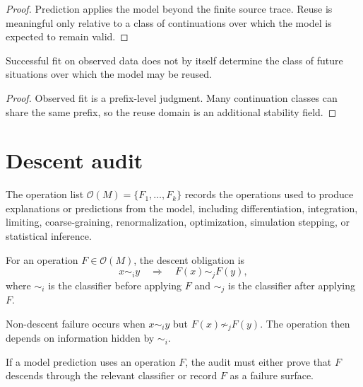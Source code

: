 \begin{proof}
Prediction applies the model beyond the finite source trace. Reuse is meaningful only relative to a class of continuations over which the model is expected to remain valid.
\end{proof}

\begin{corollary}
\label{cor:observed-success-not-own-domain}
Successful fit on observed data does not by itself determine the class of future situations over which the model may be reused.
\end{corollary}

\begin{proof}
Observed fit is a prefix-level judgment. Many continuation classes can share the same prefix, so the reuse domain is an additional stability field.
\end{proof}

\section{Descent audit}
\label{sec:descent-audit}

\begin{definition}
\label{def:operation-list-audit}
The operation list $\mathcal O(M)=\{F_1,\ldots,F_k\}$ records the operations used to produce explanations or predictions from the model, including differentiation, integration, limiting, coarse-graining, renormalization, optimization, simulation stepping, or statistical inference.
\end{definition}

\begin{definition}
\label{def:descent-obligation-audit}
For an operation $F\in\mathcal O(M)$, the descent obligation is
$$
x\sim_i y
\quad\Longrightarrow\quad
F(x)\sim_j F(y),
$$
where $\sim_i$ is the classifier before applying $F$ and $\sim_j$ is the classifier after applying $F$.
\end{definition}

\begin{definition}
\label{def:non-descent-failure-audit}
Non-descent failure occurs when $x\sim_i y$ but $F(x)\not\sim_j F(y)$. The operation then depends on information hidden by $\sim_i$.
\end{definition}

\begin{theorem}
\label{thm:prediction-operations-must-descend}
If a model prediction uses an operation $F$, the audit must either prove that $F$ descends through the relevant classifier or record $F$ as a failure surface.
\end{theorem}


